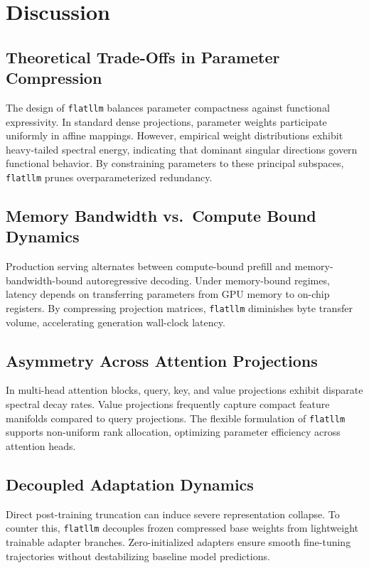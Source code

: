 \section{Discussion}

\subsection{Theoretical Trade-Offs in Parameter Compression}
The design of \texttt{flatllm} balances parameter compactness against functional expressivity. In standard dense projections, parameter weights participate uniformly in affine mappings. However, empirical weight distributions exhibit heavy-tailed spectral energy, indicating that dominant singular directions govern functional behavior. By constraining parameters to these principal subspaces, \texttt{flatllm} prunes overparameterized redundancy.

\subsection{Memory Bandwidth vs.\ Compute Bound Dynamics}
Production serving alternates between compute-bound prefill and memory-bandwidth-bound autoregressive decoding. Under memory-bound regimes, latency depends on transferring parameters from GPU memory to on-chip registers. By compressing projection matrices, \texttt{flatllm} diminishes byte transfer volume, accelerating generation wall-clock latency.

\subsection{Asymmetry Across Attention Projections}
In multi-head attention blocks, query, key, and value projections exhibit disparate spectral decay rates. Value projections frequently capture compact feature manifolds compared to query projections. The flexible formulation of \texttt{flatllm} supports non-uniform rank allocation, optimizing parameter efficiency across attention heads.

\subsection{Decoupled Adaptation Dynamics}
Direct post-training truncation can induce severe representation collapse. To counter this, \texttt{flatllm} decouples frozen compressed base weights from lightweight trainable adapter branches. Zero-initialized adapters ensure smooth fine-tuning trajectories without destabilizing baseline model predictions.

